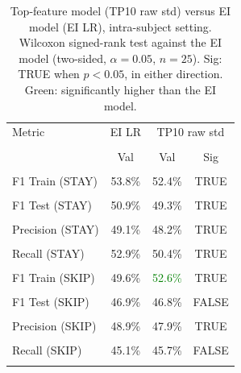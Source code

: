 \begin{table}[H]
\centering
\begin{tabular}{lccc}
\hline
Metric & EI LR & \multicolumn{2}{c}{TP10 raw std} \\\\
 & Val & Val & Sig \\\\
\hline
F1 Train (STAY) & 53.8\% & 52.4\% & TRUE \\\\
F1 Test (STAY) & 50.9\% & 49.3\% & TRUE \\\\
Precision (STAY) & 49.1\% & 48.2\% & TRUE \\\\
Recall (STAY) & 52.9\% & 50.4\% & TRUE \\\\
F1 Train (SKIP) & 49.6\% & \textcolor{green}{52.6\%} & TRUE \\\\
F1 Test (SKIP) & 46.9\% & 46.8\% & FALSE \\\\
Precision (SKIP) & 48.9\% & 47.9\% & TRUE \\\\
Recall (SKIP) & 45.1\% & 45.7\% & FALSE \\\\
\hline
\end{tabular}
\caption{Top-feature model (TP10 raw std) versus EI model (EI LR), intra-subject setting. Wilcoxon signed-rank test against the EI model (two-sided, $\alpha=0.05$, $n=25$). Sig: TRUE when $p<0.05$, in either direction. Green: significantly higher than the EI model.}
\label{tab:metrics_5_intra_3}
\end{table}